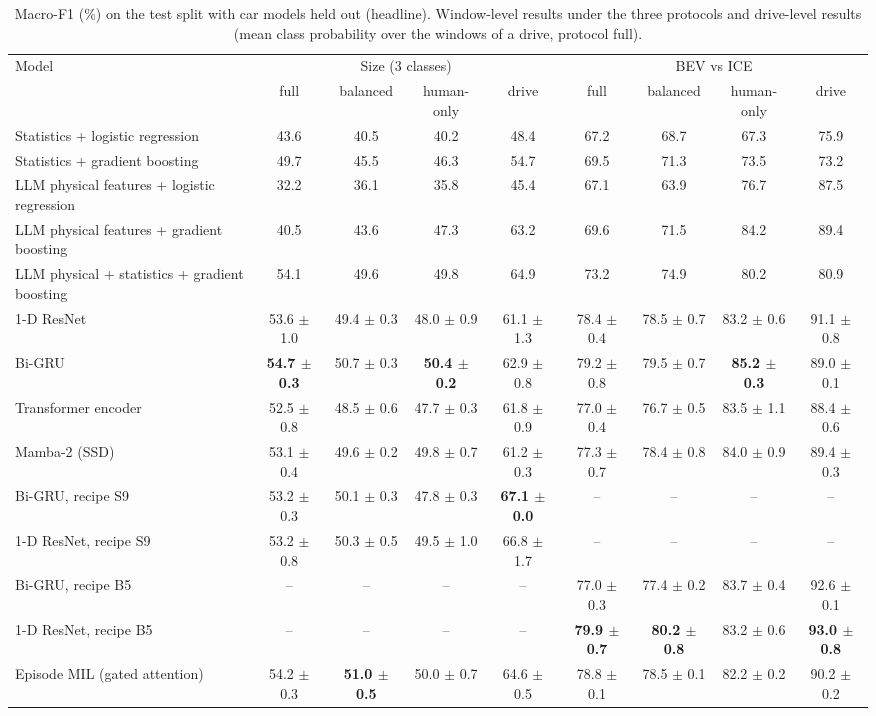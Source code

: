 \begin{table}[t]
\centering
\small
\caption{Macro-F1 (\%) on the test split with car models held out (headline). Window-level results under the three protocols and drive-level results (mean class probability over the windows of a drive, protocol full).}
\label{tab:results_split_platform}
\begin{tabular}{lcccccccc}
\toprule
Model & \multicolumn{4}{c}{Size (3 classes)} & \multicolumn{4}{c}{BEV vs ICE} \\
\cmidrule(lr){2-5} \cmidrule(lr){6-9}
 & full & balanced & human-only & drive & full & balanced & human-only & drive \\
\midrule
Statistics + logistic regression & 43.6 & 40.5 & 40.2 & 48.4 & 67.2 & 68.7 & 67.3 & 75.9 \\
Statistics + gradient boosting & 49.7 & 45.5 & 46.3 & 54.7 & 69.5 & 71.3 & 73.5 & 73.2 \\
LLM physical features + logistic regression & 32.2 & 36.1 & 35.8 & 45.4 & 67.1 & 63.9 & 76.7 & 87.5 \\
LLM physical features + gradient boosting & 40.5 & 43.6 & 47.3 & 63.2 & 69.6 & 71.5 & 84.2 & 89.4 \\
LLM physical + statistics + gradient boosting & 54.1 & 49.6 & 49.8 & 64.9 & 73.2 & 74.9 & 80.2 & 80.9 \\
1-D ResNet & 53.6 $\pm$ 1.0 & 49.4 $\pm$ 0.3 & 48.0 $\pm$ 0.9 & 61.1 $\pm$ 1.3 & 78.4 $\pm$ 0.4 & 78.5 $\pm$ 0.7 & 83.2 $\pm$ 0.6 & 91.1 $\pm$ 0.8 \\
Bi-GRU & \textbf{54.7 $\pm$ 0.3} & 50.7 $\pm$ 0.3 & \textbf{50.4 $\pm$ 0.2} & 62.9 $\pm$ 0.8 & 79.2 $\pm$ 0.8 & 79.5 $\pm$ 0.7 & \textbf{85.2 $\pm$ 0.3} & 89.0 $\pm$ 0.1 \\
Transformer encoder & 52.5 $\pm$ 0.8 & 48.5 $\pm$ 0.6 & 47.7 $\pm$ 0.3 & 61.8 $\pm$ 0.9 & 77.0 $\pm$ 0.4 & 76.7 $\pm$ 0.5 & 83.5 $\pm$ 1.1 & 88.4 $\pm$ 0.6 \\
Mamba-2 (SSD) & 53.1 $\pm$ 0.4 & 49.6 $\pm$ 0.2 & 49.8 $\pm$ 0.7 & 61.2 $\pm$ 0.3 & 77.3 $\pm$ 0.7 & 78.4 $\pm$ 0.8 & 84.0 $\pm$ 0.9 & 89.4 $\pm$ 0.3 \\
Bi-GRU, recipe S9 & 53.2 $\pm$ 0.3 & 50.1 $\pm$ 0.3 & 47.8 $\pm$ 0.3 & \textbf{67.1 $\pm$ 0.0} & -- & -- & -- & -- \\
1-D ResNet, recipe S9 & 53.2 $\pm$ 0.8 & 50.3 $\pm$ 0.5 & 49.5 $\pm$ 1.0 & 66.8 $\pm$ 1.7 & -- & -- & -- & -- \\
Bi-GRU, recipe B5 & -- & -- & -- & -- & 77.0 $\pm$ 0.3 & 77.4 $\pm$ 0.2 & 83.7 $\pm$ 0.4 & 92.6 $\pm$ 0.1 \\
1-D ResNet, recipe B5 & -- & -- & -- & -- & \textbf{79.9 $\pm$ 0.7} & \textbf{80.2 $\pm$ 0.8} & 83.2 $\pm$ 0.6 & \textbf{93.0 $\pm$ 0.8} \\
Episode MIL (gated attention) & 54.2 $\pm$ 0.3 & \textbf{51.0 $\pm$ 0.5} & 50.0 $\pm$ 0.7 & 64.6 $\pm$ 0.5 & 78.8 $\pm$ 0.1 & 78.5 $\pm$ 0.1 & 82.2 $\pm$ 0.2 & 90.2 $\pm$ 0.2 \\
\bottomrule
\end{tabular}
\end{table}
